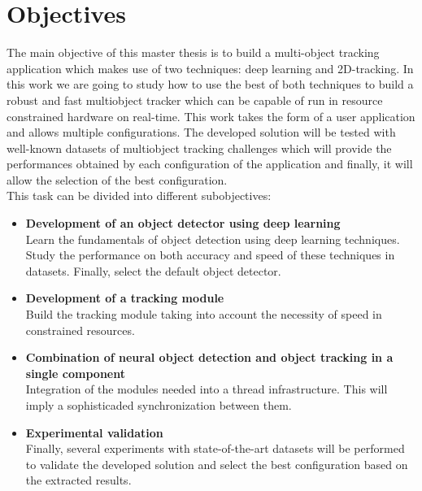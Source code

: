 \section{Objectives}
The main objective of this master thesis is to build a multi-object tracking application which makes use of two techniques: deep learning and 2D-tracking. In this work we are going to study how to use the best of both techniques to build a robust and fast multiobject tracker which can be capable of run in resource constrained hardware on real-time. This work takes the form of a user application and allows multiple configurations. The developed solution will be tested with well-known datasets of multiobject tracking challenges which will provide the performances obtained by each configuration of the application and finally, it will allow the selection of the best configuration.\\
This task can be divided into different subobjectives:
\begin{itemize}
\item \textbf{Development of an object detector using deep learning}\\
Learn the fundamentals of object detection using deep learning techniques. Study the performance on both accuracy and speed of these techniques in datasets. Finally, select the default object detector.
\item \textbf{Development of a tracking module}\\
Build the tracking module taking into account the necessity of speed in constrained resources.
\item \textbf{Combination of neural object detection and object tracking in a single component}\\
Integration of the modules needed into a thread infrastructure. This will imply a sophisticaded synchronization between them.
\item \textbf{Experimental validation}\\
Finally, several experiments with state-of-the-art datasets will be performed to validate the developed solution and select the best configuration based on the extracted results.
\end{itemize}

